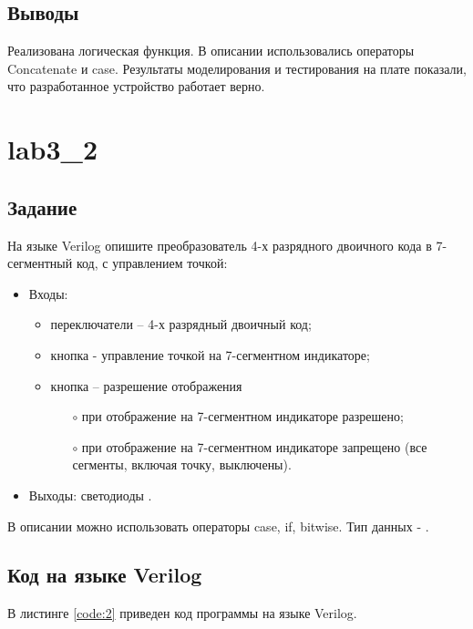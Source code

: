\subsection{Выводы}

Реализована логическая функция. В описании использовались операторы Concatenate и case. Результаты моделирования и тестирования на плате показали, что разработанное устройство работает верно.

\section{lab3\_2}

\subsection{Задание}

На языке Verilog опишите преобразователь 4-х разрядного двоичного кода в 7-сегментный код, с управлением точкой:
\begin{itemize}
	\item Входы:
		\begin{itemize}
			\item переключатели  -- 4-х разрядный двоичный код;
			\item кнопка  - управление точкой на 7-сегментном индикаторе;
			\item кнопка  – разрешение отображения
				\begin{itemize}
					\item[$\circ$] при  отображение на 7-сегментном индикаторе разрешено;
					\item[$\circ$] при  отображение на 7-сегментном индикаторе запрещено (все сегменты, включая точку, выключены).
				\end{itemize}
		\end{itemize}		
	\item Выходы: светодиоды .
\end{itemize}

В описании можно использовать операторы case, if, bitwise. Тип данных - .

\subsection{Код на языке Verilog}

В листинге \ref{code:2} приведен код программы на языке Verilog.

